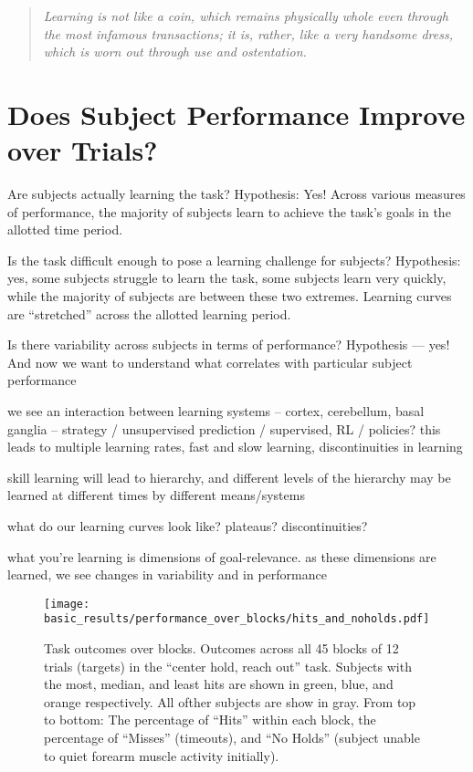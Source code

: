 \documentclass[../main.tex]{subfiles}
\begin{document}
\begin{quote}
    \emph{Learning is not like a coin, which remains physically whole even through the most infamous transactions; it is, rather, like a very handsome dress, which is worn out through use and ostentation.}
\end{quote}

\cleardoublepage%


\section{Does Subject Performance Improve over Trials?}

Are subjects actually learning the task? 
    Hypothesis: Yes! Across various measures of performance, the majority of subjects learn to achieve the task’s goals in the allotted time period.

Is the task difficult enough to pose a learning challenge for subjects?
    Hypothesis: yes, some subjects struggle to learn the task, some subjects learn very quickly, while the majority of subjects are between these two extremes. Learning curves are “stretched” across the allotted learning period.


Is there variability across subjects in terms of performance?
    Hypothesis --- yes! And now we want to understand what correlates with particular subject performance


we see an interaction between learning systems -- cortex, cerebellum, basal ganglia -- strategy / unsupervised prediction / supervised, RL / policies? this leads to multiple learning rates, fast and slow learning, discontinuities in learning

skill learning will lead to hierarchy, and different levels of the hierarchy may be learned at different times by different means/systems

what do our learning curves look like? plateaus? discontinuities?

what you're learning is dimensions of goal-relevance. as these dimensions are learned, we see changes in variability and in performance


\begin{figure}[H]
    \centering
    \texttt{[image: basic\_results/performance\_over\_blocks/hits\_and\_noholds.pdf]}
    \caption[Hit counts over trials]{Task outcomes over blocks. Outcomes across all 45 blocks of 12 trials (targets) in the ``center hold, reach out'' task. Subjects with the most, median, and least hits are shown in green, blue, and orange respectively. All ofther subjects are show in gray. From top to bottom: The percentage of ``Hits'' within each block, the percentage of ``Misses'' (timeouts), and ``No Holds'' (subject unable to quiet forearm muscle activity initially).}\label{fig:hits_and_noholds}
\end{figure}
\end{document}
